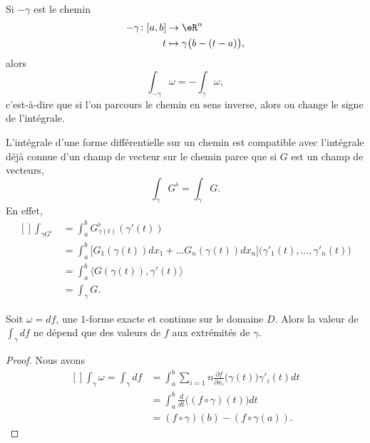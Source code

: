 \begin{remark}
	Si $-\gamma$ est le chemin
	\begin{equation}
		\begin{aligned}
			- \gamma\colon [a,b]&\to \eR^n \\
			t&\mapsto \gamma\big( b-(t-a) \big),
		\end{aligned}
	\end{equation}
	alors
	\begin{equation}
		\int_{-\gamma}\omega=-\int_{\gamma}\omega,
	\end{equation}
	c'est-à-dire que si l'on parcours le chemin en sens inverse, alors on change le signe de l'intégrale.
\end{remark}

L'intégrale d'une forme différentielle sur un chemin est compatible avec l'intégrale déjà connue d'un champ de vecteur sur le chemin parce que si $G$ est un champ de vecteurs,
\begin{equation}
	\int_{\gamma}G^{\flat}=\int_{\gamma}G.
\end{equation}
En effet,
\begin{equation}
	\begin{aligned}[]
		\int_{\gamma G^{\flat}}	&=\int_a^b G_{\gamma(t)}^{\flat}(\gamma'(t))\\
					&=\int_a^b\big[ G_1( \gamma(t) )dx_1+\ldots G_n(\gamma(t))dx_n \big]\big( \gamma'_1(t),\ldots,\gamma'_n(t) \big)\\
					&=\int_{a}^b\langle G(\gamma(t)), \gamma'(t)\rangle \\
					&=\int_{\gamma}G.
	\end{aligned}
\end{equation}


\begin{proposition}
	Soit $\omega=df$, une $1$-forme exacte et continue sur le domaine $D$. Alors la valeur de $\int_{\gamma}df$ ne dépend que des valeurs de $f$ aux extrémités de $\gamma$.
\end{proposition}

\begin{proof}
	Nous avons
	\begin{equation}
		\begin{aligned}[]
			\int_{\gamma}\omega=\int_{\gamma}df&=\int_{a}^b\sum_{i=1}n\frac{ \partial f }{ \partial x_i }\big( \gamma(t) \big)\gamma'_i(t)dt\\
				&=\int_a^b\frac{ d }{ dt }\Big( (f\circ\gamma)(t) \Big)dt\\
				&=(f\circ\gamma)(b)-(f\circ\gamma(a)).
		\end{aligned}
	\end{equation}
\end{proof}

